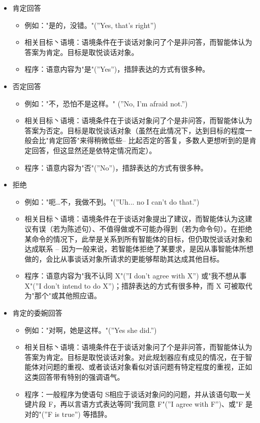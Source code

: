 \begin{itemize}


\item 肯定回答
\begin{itemize}
\item 例如："是的，没错。"(”Yes, that’s right”)
\item 相关目标丶语境：语境条件在于谈话对象问了个是非问答，而智能体认为答案为肯定。目标是取悦谈话对象。
\item 程序：语意内容为"是"(”Yes”)，措辞表达的方式有很多种。
\end{itemize}


\item 否定回答
\begin{itemize}
\item 例如："不，恐怕不是这样。" (”No, I’m afraid not.”)
\item 相关目标丶语境：语境条件在于谈话对象问了个是非问答，而智能体认为答案为否定。目标是取悦谈话对象（虽然在此情况下，达到目标的程度一般会比"肯定回答"来得稍微低些– 比起否定的答复，多数人更想听到的是肯定回答，但这显然还是依特定情况而定）。 
\item 程序：语意内容为"否"(”No”)，措辞表达的方式有很多种。
\end{itemize}


\item 拒绝
\begin{itemize}
\item 例如："呃…不，我做不到。"(”Uh... no I can’t do that.”)
\item 相关目标丶语境：语境条件在于谈话对象提出了建议，而智能体认为这建议有误（若为陈述句）、不值得做或不可能办得到（若为命令句）。在拒绝某命令的情况下，此举是关系到所有智能体的目标，但仍取悦谈话对象和达成联系 – 因为一般来说，若智能体拒绝了某要求，是因从事智能体所想做的，会比从事谈话对象所请求的更能够帮助其达成其他目标。
\item 程序：语意内容为"我不认同 X"(”I don’t agree with X”) 或"我不想从事 X"(”I don’t intend to do X”)；措辞表达的方式有很多种，而 X 可被取代为"那个"或其他照应语。
\end{itemize}


\item 肯定的委婉回答
\begin{itemize}
\item 例如："对啊，她是这样。"(”Yes she did.”)
\item 相关目标丶语境：语境条件在于谈话对象问了个是非问答，而智能体认为答案为肯定。目标是取悦谈话对象。对此规划器应有成见的情况，在于智能体对问题的重视、或者谈话对象看似对该问题有特定程度的重视，正如这类回答带有特别的强调语气。 
\item 程序：一般程序为使语句 S相应于谈话对象问的问题，并从该语句取一关键片段 F，再以言语方式表达等同"我同意 F"(”I agree with F”)、或"F 是对的"(”F is true”) 等措辞。
\end{itemize}



\end{itemize}
